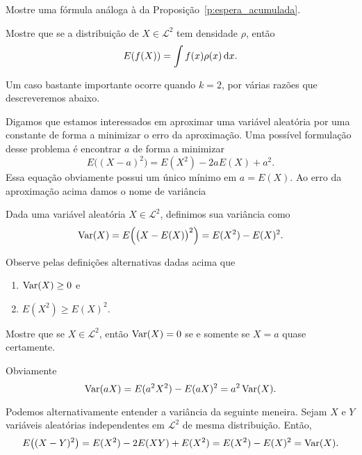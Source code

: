 \begin{exercise}
  Mostre uma fórmula análoga à da Proposição~\ref{p:espera_acumulada}.
\end{exercise}

\begin{exercise}
  Mostre que se a distribuição de $X \in \mathcal{L}^2$ tem densidade $\rho$, então
  \begin{equation}
    E(f(X)) = \int f(x) \rho(x) \mathop{}\!\mathrm{d} x.
  \end{equation}
\end{exercise}

Um caso bastante importante ocorre quando $k = 2$, por várias razões que descreveremos abaixo.

Digamos que estamos interessados em aproximar uma variável aleatória por uma constante de forma a minimizar o erro da aproximação.
Uma possível formulação desse problema é encontrar $a$ de forma a minimizar
\begin{equation}
  E\Big( (X - a)^2 \Big) = E(X^2) - 2 a E(X) + a^2.
\end{equation}
Essa equação obviamente possui um único mínimo em $a = E(X)$.
Ao erro da aproximação acima damos o nome de variância

\begin{definition}
  Dada uma variável aleatória $X \in \mathcal{L}^2$, definimos sua variância  como
  \begin{equation}
    \operatorname{Var}(X) = E \Big( \big(X - E(X)\big)^2 \Big) = E(X^2) - E(X)^2.
  \end{equation}
\end{definition}

Observe pelas definições alternativas dadas acima que
\begin{enumerate}[\quad a)]
\item $\operatorname{Var}(X) \geq 0$ e
\item $E(X^2) \geq E(X)^2$.
\end{enumerate}

\begin{exercise}
  Mostre que se $X \in \mathcal{L}^2$, então $\operatorname{Var}(X) = 0$ se e somente se $X = a$ quase certamente.
\end{exercise}

Obviamente
\begin{equation}
  \operatorname{Var}(a X) = E(a^2 X^2) - E(aX)^2 = a^2 \operatorname{Var}(X).
\end{equation}

Podemos alternativamente entender a variância da seguinte meneira.
Sejam $X$ e $Y$ variáveis aleatórias independentes em $\mathcal{L}^2$ de mesma distribuição.
Então,
\begin{equation}
  E\big( (X - Y)^2 \big) = E(X^2) - 2 E(XY) + E(X^2) = E(X^2) - E(X)^2 = \operatorname{Var}(X).
\end{equation}

